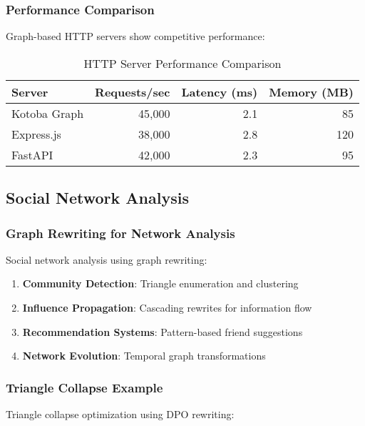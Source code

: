 \documentclass[11pt,a4paper]{article}
\begin{document}
\subsubsection{Performance Comparison}
\label{subsubsec:http_performance}

Graph-based HTTP servers show competitive performance:

\begin{table}[H]
\centering
\caption{HTTP Server Performance Comparison}
\label{tab:http_perf}
\begin{tabular}{@{}lrrr@{}}
\toprule
Server & Requests/sec & Latency (ms) & Memory (MB) \\
\midrule
Kotoba Graph & 45,000 & 2.1 & 85 \\
Express.js & 38,000 & 2.8 & 120 \\
FastAPI & 42,000 & 2.3 & 95 \\
\bottomrule
\end{tabular}
\end{table}

\subsection{Social Network Analysis}
\label{subsec:social_network}

\subsubsection{Graph Rewriting for Network Analysis}
\label{subsubsec:social_rewriting}

Social network analysis using graph rewriting:

\begin{enumerate}
\item \textbf{Community Detection}: Triangle enumeration and clustering
\item \textbf{Influence Propagation}: Cascading rewrites for information flow
\item \textbf{Recommendation Systems}: Pattern-based friend suggestions
\item \textbf{Network Evolution}: Temporal graph transformations
\end{enumerate}

\subsubsection{Triangle Collapse Example}
\label{subsubsec:triangle_example}

Triangle collapse optimization using DPO rewriting:
\end{document}
